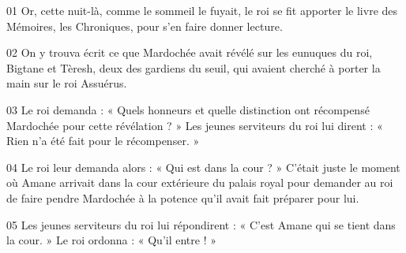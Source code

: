 01 Or, cette nuit-là, comme le sommeil le fuyait, le roi se fit apporter le livre des Mémoires, les Chroniques, pour s’en faire donner lecture.

02 On y trouva écrit ce que Mardochée avait révélé sur les eunuques du roi, Bigtane et Tèresh, deux des gardiens du seuil, qui avaient cherché à porter la main sur le roi Assuérus.

03 Le roi demanda : « Quels honneurs et quelle distinction ont récompensé Mardochée pour cette révélation ? » Les jeunes serviteurs du roi lui dirent : « Rien n’a été fait pour le récompenser. »

04 Le roi leur demanda alors : « Qui est dans la cour ? » C’était juste le moment où Amane arrivait dans la cour extérieure du palais royal pour demander au roi de faire pendre Mardochée à la potence qu’il avait fait préparer pour lui.

05 Les jeunes serviteurs du roi lui répondirent : « C’est Amane qui se tient dans la cour. » Le roi ordonna : « Qu’il entre ! »
